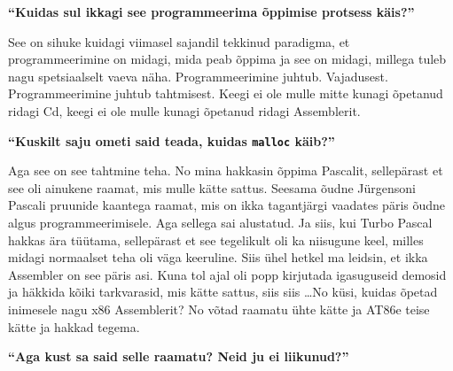 \textbf{\enquote{Kuidas sul ikkagi see programmeerima õppimise protsess käis?}}

See on sihuke  kuidagi viimasel sajandil tekkinud paradigma, et 
programmeerimine on midagi, mida peab õppima ja see on midagi, millega tuleb 
nagu spetsiaalselt vaeva näha. Programmeerimine juhtub. Vajadusest. 
Programmeerimine juhtub tahtmisest. Keegi ei ole mulle mitte kunagi õpetanud 
ridagi Cd, keegi ei ole mulle kunagi õpetanud ridagi Assemblerit. 

\textbf{\enquote{Kuskilt saju ometi said teada, kuidas \texttt{malloc} käib?}}

Aga see on see tahtmine teha. No mina hakkasin õppima 
Pascalit, sellepärast et see oli ainukene raamat, mis 
mulle kätte sattus. Seesama õudne Jürgensoni Pascali pruunide kaantega 
raamat, mis on ikka tagantjärgi vaadates 
päris õudne algus programmeerimisele. Aga sellega sai alustatud. Ja siis, kui 
Turbo Pascal hakkas ära tüütama, sellepärast et see tegelikult oli ka niisugune 
keel, milles midagi normaalset teha oli väga keeruline. Siis ühel hetkel ma 
leidsin, et ikka Assembler on see päris asi. Kuna tol 
ajal oli popp kirjutada igasuguseid demosid ja häkkida kõiki tarkvarasid, mis 
kätte sattus, siis siis \ldots No küsi, kuidas õpetad inimesele nagu x86 
Assemblerit? No võtad raamatu ühte kätte ja AT86e teise kätte ja hakkad tegema.

\textbf{\enquote{Aga kust sa said selle raamatu? Neid ju ei liikunud?}}

